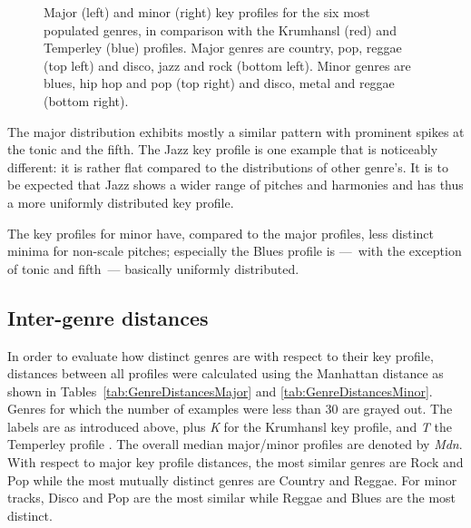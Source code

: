 \documentclass{article}
\begin{document}
\begin{figure}[tb]
	\caption{Major (left) and minor (right) key profiles for the six most populated genres, in comparison with the Krumhansl (red) and Temperley (blue) profiles. Major genres are country, pop, reggae (top left) and disco, jazz and rock (bottom left). Minor genres are blues, hip hop and pop (top right) and disco, metal and reggae (bottom right).}
	\label{fig:SpecificKeyProfiles}
\end{figure}
The major distribution exhibits mostly a similar pattern with prominent spikes at the tonic and the fifth. The Jazz key profile is one example that is noticeably different: it is rather flat compared to the distributions of other genre's. It is to be expected that Jazz shows a wider range of pitches and harmonies and has thus a more uniformly distributed key profile.

The key profiles for minor have, compared to the major profiles, less distinct minima for non-scale pitches; especially the Blues profile is ---~with the exception of tonic and fifth~--- basically uniformly distributed.

\subsection{Inter-genre distances}
In order to evaluate how distinct genres are with respect to their key profile, distances between all profiles were calculated using the Manhattan distance as shown in Tables~\ref{tab:GenreDistancesMajor} and \ref{tab:GenreDistancesMinor}. Genres for which the number of examples were less than 30 are grayed out. The labels are as introduced above, plus \textit{K} for the Krumhansl key profile,  and \textit{T} the Temperley profile \cite{temperley_tonal_2007}. The overall median major/minor profiles are denoted by \textit{Mdn}.
With respect to major key profile distances, the most similar genres are Rock and Pop while the most mutually distinct genres are Country and Reggae. For minor tracks, Disco and Pop are the most similar while Reggae and Blues are the most distinct.

\end{document}
